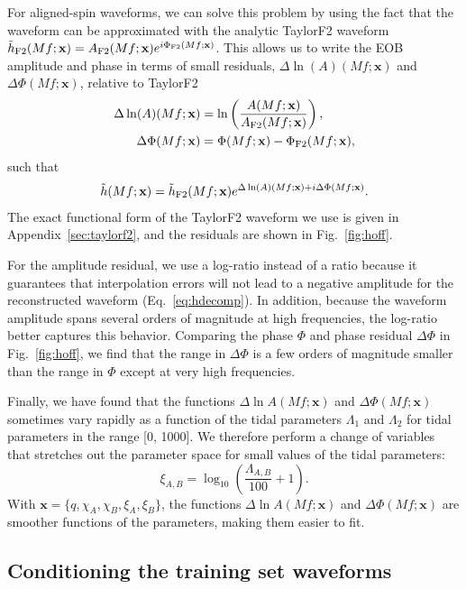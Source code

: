 \documentclass[prd,aps,letter,twocolumn,floatfix,notitlepage,nofootinbib]{revtex4-1}
\def\bx{\mathbf{x}}
\begin{document}
For aligned-spin waveforms, we can solve this problem by using the fact that the waveform can be approximated with the analytic TaylorF2 waveform $\tilde h_{\rm F2}(Mf; \bx) = A_{\rm F2}(Mf; \bx) e^{i\Phi_{\rm F2} (Mf; \bx)}$. This allows us to write the EOB amplitude and phase in terms of small residuals, $\Delta\ln(A)(Mf; \bx)$ and $\Delta\Phi(Mf; \bx)$, relative to TaylorF2
\begin{align}
\Delta\ln(A)(Mf; \bx) &= \ln\left(\frac{ A(Mf; \bx) }{ A_{\rm F2}(Mf; \bx)}\right), \label{eq:ampres}\\
\Delta\Phi(Mf; \bx) & = \Phi(Mf; \bx) - \Phi_{\rm F2}(Mf; \bx), \label{eq:phaseres}
\end{align}
such that
\begin{align}
\tilde h(Mf; \bx) = \tilde h_{\rm F2}(Mf; \bx) e^{\Delta\ln(A)(Mf; \bx) + i  \Delta\Phi(Mf; \bx)}.
\label{eq:hdecomp}
\end{align}
The exact functional form of the TaylorF2 waveform we use is given in Appendix~\ref{sec:taylorf2}, and the residuals are shown in Fig.~\ref{fig:hoff}. 

For the amplitude residual, we use a log-ratio instead of a ratio because it guarantees that interpolation errors will not lead to a negative amplitude for the reconstructed waveform (Eq.~\eqref{eq:hdecomp}). In addition, because the waveform amplitude spans several orders of magnitude at high frequencies, the log-ratio better captures this behavior. Comparing the phase $\Phi$ and phase residual $\Delta\Phi$ in Fig.~\ref{fig:hoff}, we find that the range in $\Delta\Phi$ is a few orders of magnitude smaller than the range in $\Phi$ except at very high frequencies. 

Finally, we have found that the functions $\Delta\ln A(Mf; \bx)$ and $\Delta\Phi(Mf; \bx)$ sometimes vary rapidly as a function of the tidal parameters $\Lambda_1$ and $\Lambda_2$ for tidal parameters in the range [0, 1000]. We therefore perform a change of variables that stretches out the parameter space for small values of the tidal parameters:
\begin{equation}
\xi_{A, B} = \log_{10}\left(\frac{\Lambda_{A, B}}{100} + 1\right).
\end{equation}
With $\bx=\{q, \chi_A, \chi_B, \xi_A,\xi_B\}$, the functions $\Delta\ln A(Mf; \bx)$ and $\Delta\Phi(Mf; \bx)$ are smoother functions of the parameters, making them easier to fit.


\subsection{Conditioning the training set waveforms}
\label{sec:condition}
\end{document}
